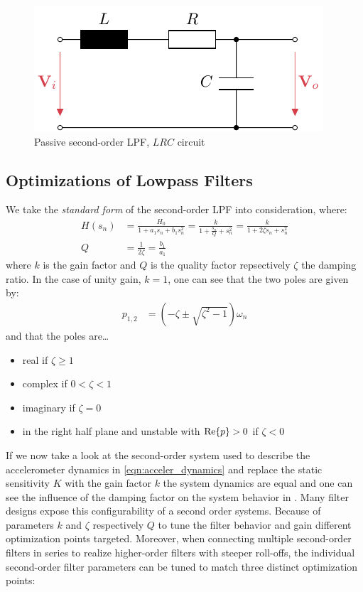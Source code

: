 \begin{figure}[htb!]
  \centering
  \includegraphics[scale=1]{figures/electronics/lowpass/lp_passive_2ord/lp_passive_2ord}
  \caption[Passive second-order \ac{LPF}]{Passive second-order \ac{LPF}, $LRC$ circuit%
    \label{fig:lp_passive_2ord}}
\end{figure}

\subsection{Optimizations of Lowpass Filters}
We take the \emph{standard form} of the second-order \ac{LPF} into consideration, where:
\begin{align}
  H(s_n) &= \frac{H_0}{1+a_1s_n+b_1s_n^2} = \frac{k}{\displaystyle 1+\frac{s_n}{Q}+s_n^2} = \frac{k}{1+2\zeta s_n+s_n^2} \\
  Q &= \frac{1}{2\zeta} = \frac{b_1}{a_1}
\end{align}
where $k$ is the gain factor and $Q$ is the quality factor repsectively $\zeta$ the damping ratio. In the case of unity gain, $k=1$, one can see that the two poles are given by:
\begin{align}
  p_{1,2} &= (-\zeta \pm \sqrt{\zeta^2-1})\omega_n
\end{align}
and that the poles are\dots
\begin{itemize}
  \item real if $\zeta\geq 1$
  \item complex if $0<\zeta<1$
  \item imaginary if $\zeta=0$
  \item in the right half plane and unstable with $\mathrm{Re}\Bqty{p}>0$ if $\zeta<0$
\end{itemize}
If we now take a look at the second-order system used to describe the accelerometer dynamics in \eqref{eqn:acceler_dynamics} and replace the static sensitivity $K$ with the gain factor $k$ the system dynamics are equal and one can see the influence of the damping factor on the system behavior in .
Many filter designs expose this configurability of a second order systems. Because of parameters $k$ and $\zeta$ respectively $Q$ to tune the filter behavior and gain different optimization points targeted. Moreover, when connecting multiple second-order filters in series to realize higher-order filters with steeper roll-offs, the individual second-order filter parameters can be tuned to match three distinct optimization points:

